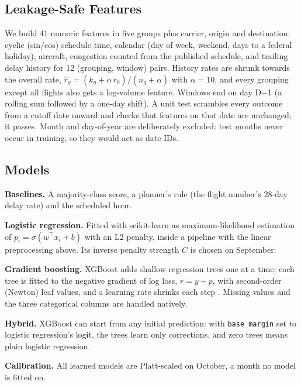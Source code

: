 \documentclass[conference]{IEEEtran}
\begin{document}
\subsection{Leakage-Safe Features}
We build 41 numeric features in five groups plus carrier, origin and destination: cyclic (sin/cos) schedule time, calendar (day of week, weekend, days to a federal holiday), aircraft, congestion counted from the published schedule, and trailing delay history for 12 (grouping, window) pairs. History rates are shrunk towards the overall rate, $\hat r_g=(k_g+\alpha\,r_0)/(n_g+\alpha)$ with $\alpha=10$, and every grouping except all flights also gets a log-volume feature. Windows end on day D$-$1 (a rolling sum followed by a one-day shift). A unit test scrambles every outcome from a cutoff date onward and checks that features on that date are unchanged; it passes. Month and day-of-year are deliberately excluded: test months never occur in training, so they would act as date IDs.

\subsection{Models}
\textbf{Baselines.} A majority-class score, a planner's rule (the flight number's 28-day delay rate) and the scheduled hour.

\textbf{Logistic regression.} Fitted with scikit-learn as maximum-likelihood estimation of $p_i=\sigma(w^\top x_i+b)$ with an L2 penalty, inside a pipeline with the linear preprocessing above. Its inverse penalty strength $C$ is chosen on September.

\textbf{Gradient boosting.} XGBoost \cite{chen2016} adds shallow regression trees one at a time; each tree is fitted to the negative gradient of log loss, $r=y-p$, with second-order (Newton) leaf values, and a learning rate shrinks each step \cite{friedman2001}. Missing values and the three categorical columns are handled natively.

\textbf{Hybrid.} XGBoost can start from any initial prediction: with \texttt{base\_margin} set to logistic regression's logit, the trees learn only corrections, and zero trees means plain logistic regression.

\textbf{Calibration.} All learned models are Platt-scaled \cite{platt1999} on October, a month no model is fitted on.
\end{document}
